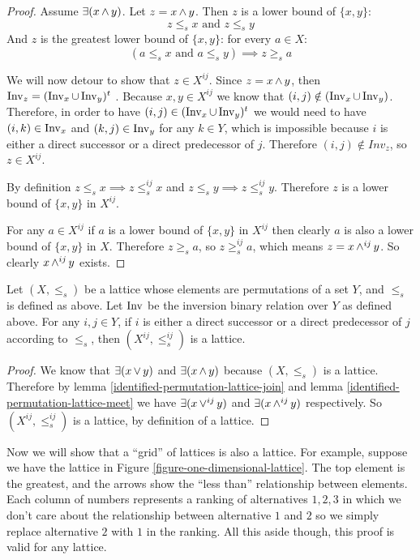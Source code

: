 	\begin{proof}
		Assume $\exists(x \operatorname{\wedge} y)$. Let $z = x \operatorname{\wedge} y$. Then $z$ is a lower bound of $\{x, y\}$:
		\[
			z \le_s x \textrm{ and } z \le_s y
		\]
		And $z$ is the greatest lower bound of $\{x, y\}$: for every $a \in X$:
		\[
			(a \le_s x \textrm{ and } a \le_s y) \implies z \ge_s a
		\]

		We will now detour to show that $z \in X^{ij}$. Since $z = x \operatorname{\wedge} y$, then $\operatorname{Inv}_z = (\operatorname{Inv}_x \cup \operatorname{Inv}_y)^t$ \cite{markowsky1994permutation}. Because $x,y \in X^{ij}$ we know that $(i, j) \notin (\operatorname{Inv}_x \cup \operatorname{Inv}_y)$. Therefore, in order to have $(i, j) \in (\operatorname{Inv}_x \cup \operatorname{Inv}_y)^t$ we would need to have $(i, k) \in \operatorname{Inv}_x$ and $(k, j) \in \operatorname{Inv}_y$ for any $k \in Y$, which is impossible because $i$ is either a direct successor or a direct predecessor of $j$. Therefore $(i, j) \notin Inv_z$, so $z \in X^{ij}$.

		By definition $z \le_s x \implies z \le^{ij}_s x$ and $z \le_s y \implies z \le^{ij}_s y$. Therefore $z$ is a lower bound of $\{x, y\}$ in $X^{ij}$.

		For any $a \in X^{ij}$ if $a$ is a lower bound of $\{x, y\}$ in $X^{ij}$ then clearly $a$ is also a lower bound of $\{x, y\}$ in $X$. Therefore $z \ge_s a$, so $z \ge^{ij}_s a$, which means $z = x \operatorname{\wedge}^{ij} y$. So clearly $x \operatorname{\wedge}^{ij} y$ exists.
	\end{proof}

	\begin{proposition}
		\label{proposition-identification-is-lattice}
		Let $(X, \le_s)$ be a lattice whose elements are permutations of a set $Y$, and $\le_s$ is defined as above. Let $\operatorname{Inv}$ be the inversion binary relation over $Y$ as defined above. For any $i,j \in Y$, if $i$ is either a direct successor or a direct predecessor of $j$ according to $\le_s$, then $(X^{ij}, \le^{ij}_s)$ is a lattice.
	\end{proposition}

	\begin{proof}
		We know that $\exists(x \operatorname{\vee} y)$ and $\exists(x \operatorname{\wedge} y)$ because $(X, \le_s)$ is a lattice. Therefore by lemma \ref{identified-permutation-lattice-join} and lemma \ref{identified-permutation-lattice-meet} we have $\exists(x \operatorname{\vee}^{ij} y)$ and $\exists(x \operatorname{\wedge}^{ij} y)$ respectively. So $(X^{ij}, \le^{ij}_s)$ is a lattice, by definition of a lattice.
	\end{proof}

	Now we will show that a ``grid'' of lattices is also a lattice. For example, suppose we have the lattice in Figure \ref{figure-one-dimensional-lattice}. The top element is the greatest, and the arrows show the ``less than'' relationship between elements. Each column of numbers represents a ranking of alternatives ${1, 2, 3}$ in which we don't care about the relationship between alternative $1$ and $2$ so we simply replace alternative $2$ with $1$ in the ranking. All this aside though, this proof is valid for any lattice.

